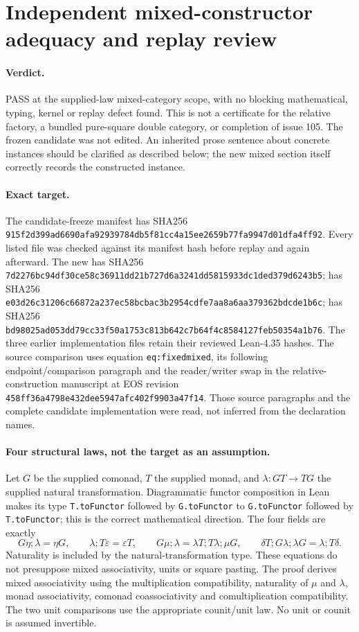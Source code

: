 \documentclass{article}
\begin{document}
\section*{Independent mixed-constructor adequacy and replay review}
\paragraph{Verdict.} PASS at the supplied-law mixed-category scope, with no blocking mathematical, typing, kernel or replay defect found. This is not a certificate for the relative factory, a bundled pure-square double category, or completion of issue 105. The frozen candidate was not edited. An inherited prose sentence about concrete instances should be clarified as described below; the new mixed section itself correctly records the constructed instance.

\paragraph{Exact target.} The candidate-freeze manifest has SHA256
\texttt{915f2d399ad6690afa92939784db5f81cc4a15ee2659b77fa9947d01dfa4ff92}.
Every listed file was checked against its manifest hash before replay and again afterward. The new  has SHA256
\texttt{7d2276bc94df30ce58c36911dd21b727d6a3241dd5815933dc1ded379d6243b5};
 has SHA256
\texttt{e03d26c31206c66872a237ec58bcbac3b2954cdfe7aa8a6aa379362bdcde1b6c};
 has SHA256
\texttt{bd98025ad053dd79cc33f50a1753c813b642c7b64f4c8584127feb50354a1b76}.
The three earlier implementation files retain their reviewed Lean-4.35 hashes. The source comparison uses equation \texttt{eq:fixedmixed}, its following endpoint/comparison paragraph and the reader/writer swap in the relative-construction manuscript at EOS revision \texttt{458ff36a4798e432dee5947afc402f9903a47f14}. Those source paragraphs and the complete candidate implementation were read, not inferred from the declaration names.

\paragraph{Four structural laws, not the target as an assumption.}
Let $G$ be the supplied comonad, $T$ the supplied monad, and $\lambda:GT\to TG$ the supplied natural transformation. Diagrammatic functor composition in Lean makes its type \texttt{T.toFunctor} followed by \texttt{G.toFunctor} to \texttt{G.toFunctor} followed by \texttt{T.toFunctor}; this is the correct mathematical direction. The four fields are exactly
\[
 G\eta;\lambda=\eta G,\qquad
 \lambda;T\varepsilon=\varepsilon T,\qquad
 G\mu;\lambda=\lambda T;T\lambda;\mu G,\qquad
 \delta T;G\lambda;\lambda G=\lambda;T\delta.
\]
Naturality is included by the natural-transformation type. These equations do not presuppose mixed associativity, units or square pasting. The proof derives mixed associativity using the multiplication compatibility, naturality of $\mu$ and $\lambda$, monad associativity, comonad coassociativity and comultiplication compatibility. The two unit comparisons use the appropriate counit/unit law. No unit or counit is assumed invertible.
\end{document}
